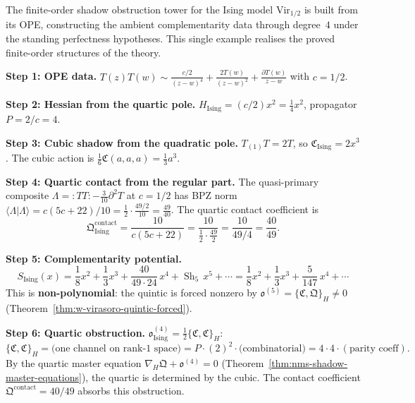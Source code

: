 \begin{computation}
\label{comp:ising-shadow-tower}
The finite-order shadow obstruction tower for the
Ising model $\mathrm{Vir}_{1/2}$ is built from its OPE, constructing
the ambient complementarity data through degree~$4$ under the
standing perfectness hypotheses. This single
example realises the proved finite-order structures of the theory.

\medskip\noindent\textbf{Step 1: OPE data.}
$T(z)T(w) \sim \frac{c/2}{(z-w)^4} + \frac{2T(w)}{(z-w)^2}
+ \frac{\partial T(w)}{z-w}$
with $c = 1/2$.

\medskip\noindent\textbf{Step 2: Hessian from the quartic pole.}
$H_{\mathrm{Ising}} = (c/2)x^2 = \frac{1}{4}x^2$,
propagator $P = 2/c = 4$.

\medskip\noindent\textbf{Step 3: Cubic shadow from the quadratic
pole.} $T_{(1)}T = 2T$, so
$\mathfrak{C}_{\mathrm{Ising}} = 2x^3$. The cubic action is
$\frac{1}{6}\mathfrak{C}(a,a,a) = \frac{1}{3}a^3$.

\medskip\noindent\textbf{Step 4: Quartic contact from the regular
part.}
The quasi-primary composite
$\Lambda = {:}TT{:} - \frac{3}{10}\partial^2 T$ at $c = 1/2$
has BPZ norm
$\langle\Lambda|\Lambda\rangle = c(5c+22)/10
= \frac{1}{2}\cdot\frac{49/2}{10} = \frac{49}{40}$.
The quartic contact coefficient is
\begin{equation}\label{eq:ising-quartic-contact}
\mathfrak{Q}^{\mathrm{contact}}_{\mathrm{Ising}}
= \frac{10}{c(5c+22)}
= \frac{10}{\frac{1}{2}\cdot\frac{49}{2}}
= \frac{10}{49/4}
= \frac{40}{49}.
\end{equation}

\medskip\noindent\textbf{Step 5: Complementarity potential.}
\begin{equation}\label{eq:ising-complementarity-potential}
S_{\mathrm{Ising}}(x)
= \frac{1}{8}x^2
+ \frac{1}{3}x^3
+ \frac{40}{49 \cdot 24}\,x^4
+ \operatorname{Sh}_5\,x^5 + \cdots
= \frac{1}{8}x^2
+ \frac{1}{3}x^3
+ \frac{5}{147}\,x^4
+ \cdots
\end{equation}
This is \textbf{non-polynomial}: the quintic is forced nonzero by
$\mathfrak{o}^{(5)} = \{\mathfrak{C},\mathfrak{Q}\}_H \neq 0$
(Theorem~\ref{thm:w-virasoro-quintic-forced}).

\medskip\noindent\textbf{Step 6: Quartic obstruction.}
$\mathfrak{o}^{(4)}_{\mathrm{Ising}}
= \frac{1}{2}\{\mathfrak{C},\mathfrak{C}\}_H$:
\[
\{\mathfrak{C},\mathfrak{C}\}_H
= \text{(one channel on rank-1 space)}
= P \cdot (2)^2 \cdot \text{(combinatorial)}
= 4 \cdot 4 \cdot (\text{parity coeff}).
\]
By the quartic master equation
$\nabla_H\mathfrak{Q} + \mathfrak{o}^{(4)} = 0$
(Theorem~\ref{thm:nms-shadow-master-equations}), the quartic is
determined by the cubic. The contact coefficient
$\mathfrak{Q}^{\mathrm{contact}} = 40/49$ absorbs this
obstruction.


\end{computation}
